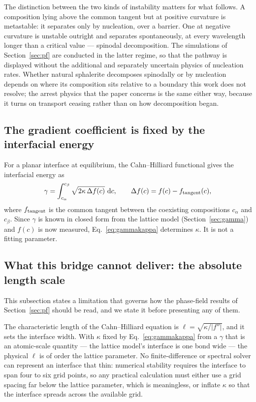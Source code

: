 \documentclass[preprint,12pt,authoryear]{elsarticle}
\begin{document}
The distinction between the two kinds of instability matters for what follows.
A composition lying above the common tangent but at positive curvature is
metastable: it separates only by nucleation, over a barrier. One at negative
curvature is unstable outright and separates spontaneously, at every wavelength
longer than a critical value --- spinodal decomposition. The simulations of
Section~\ref{sec:pf} are conducted in the latter regime, so that the pathway is
displayed without the additional and separately uncertain physics of nucleation
rates. Whether natural sphalerite decomposes spinodally or by nucleation depends
on where its composition sits relative to a boundary this work does not resolve;
the arrest physics that the paper concerns is the same either way, because it
turns on transport ceasing rather than on how decomposition began.

\subsection{The gradient coefficient is fixed by the interfacial energy}
\label{sec:kappa}

For a planar interface at equilibrium, the Cahn--Hilliard functional gives the
interfacial energy as
\begin{equation}
\gamma = \int_{c_\alpha}^{c_\beta} \sqrt{2\kappa\, \Delta f(c)}\ \mathrm{d}c,
\qquad
\Delta f(c) = f(c) - f_{\rm tangent}(c),
\label{eq:gammakappa}
\end{equation}
where $f_{\rm tangent}$ is the common tangent between the coexisting
compositions $c_\alpha$ and $c_\beta$. Since $\gamma$ is known in closed form
from the lattice model (Section~\ref{sec:gamma}) and $f(c)$ is now measured,
Eq.~\eqref{eq:gammakappa} determines $\kappa$. It is not a fitting parameter.

\subsection{What this bridge cannot deliver: the absolute length scale}
\label{sec:kappacaveat}

This subsection states a limitation that governs how the phase-field results of
Section~\ref{sec:pf} should be read, and we state it before presenting any of
them.

The characteristic length of the Cahn--Hilliard equation is
$\ell = \sqrt{\kappa / |f''|}$, and it sets the interface width. With $\kappa$
fixed by Eq.~\eqref{eq:gammakappa} from a $\gamma$ that is an atomic-scale
quantity --- the lattice model's interface is one bond wide --- the physical
$\ell$ is of order the lattice parameter. No finite-difference or spectral
solver can represent an interface that thin: numerical stability requires the
interface to span four to six grid points, so any practical calculation must
either use a grid spacing far below the lattice parameter, which is
meaningless, or inflate $\kappa$ so that the interface spreads across the
available grid.
\end{document}
